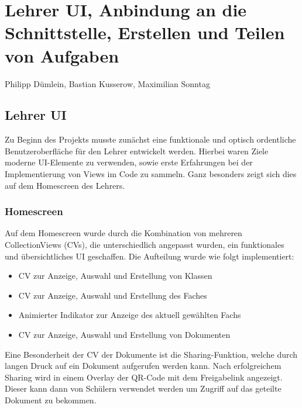 \chapter{Lehrer UI, Anbindung an die Schnittstelle, Erstellen und Teilen von Aufgaben}
Philipp Dümlein, Bastian Kusserow, Maximilian Sonntag


\section{Lehrer UI}
Zu Beginn des Projekts musste zunächst eine funktionale und optisch ordentliche Benutzeroberfläche für den Lehrer entwickelt werden. Hierbei waren Ziele moderne UI-Elemente zu verwenden, sowie erste Erfahrungen bei der Implementierung von Views im Code zu sammeln. Ganz besonders zeigt sich dies auf dem Homescreen des Lehrers.
\subsection{Homescreen}
Auf dem Homescreen wurde durch die Kombination von mehreren CollectionViews (CVs), die unterschiedlich angepasst wurden, ein funktionales und übersichtliches UI geschaffen. Die Aufteilung wurde wie folgt implementiert:
\begin{itemize}
\item CV zur Anzeige, Auswahl und Erstellung von Klassen
\item CV zur Anzeige, Auswahl und Erstellung des Faches    
\item Animierter Indikator zur Anzeige des aktuell gewählten Fachs
\item CV zur Anzeige, Auswahl und Erstellung von Dokumenten
\end{itemize}
Eine Besonderheit der CV der Dokumente ist die Sharing-Funktion, welche durch langen Druck auf ein Dokument aufgerufen werden kann. Nach erfolgreichem Sharing wird in einem Overlay der QR-Code mit dem Freigabelink angezeigt. Dieser kann dann von Schülern verwendet werden um Zugriff auf das geteilte Dokument zu bekommen.

